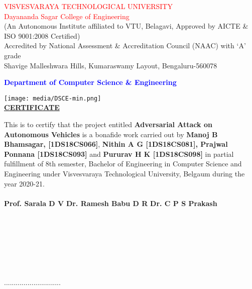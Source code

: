 \documentclass[ 12pt,a4paper,twocolumn,fleqn]{article}
\begin{document}
\begin{center}
\textcolor{red}{\LARGE{VISVESVARAYA TECHNOLOGICAL UNIVERSITY}} \\
\textcolor{red}{\LARGE{Dayananda Sagar College of Engineering}} \\
\footnotesize{(An Autonomous Institute affiliated to VTU, Belagavi, Approved by AICTE \& ISO 9001:2008 Certified)} \\
\footnotesize{Accredited by National Assessment \& Accreditation Council (NAAC) with ‘A’ grade}  \\
\footnotesize{Shavige Malleshwara Hills, Kumaraswamy Layout, Bengaluru-560078} \\
\begin{flushleft}
\textcolor{blue}{\LARGE{\textbf{Department of Computer Science \& Engineering}}} \\
\end{flushleft}
\texttt{[image: media/DSCE-min.png]} \\
\Large{\underline{\textbf{CERTIFICATE}}} \\
  \end{center}
\normalsize
This is to certify that the project entitled \textbf{Adversarial Attack on Autonomous Vehicles} is a bonafide work carried out by \textbf{Manoj B Bhamsagar, [1DS18CS066]}, \textbf{Nithin A G [1DS18CS081], Prajwal Ponnana [1DS18CS093]} and \textbf{Pururav H K [1DS18CS098]} in partial fulfillment of 8th semester, Bachelor of Engineering in Computer Science and Engineering under Visvesvaraya Technological University, Belgaum during the year 2020-21. \\
\\
\textbf{Prof. Sarala D V}
\hfill
\textbf{Dr. Ramesh Babu D R}
\hfill
\textbf{Dr. C P S Prakash} \\
\hfill
{}
\hfill
{} \\
\hfill
{}
\hfill
{} \\
\\
\hfill
{}
\hfill
{} \\
\\
\\
\hfill
{} \\
\hfill{.............................} \\
\end{document}
